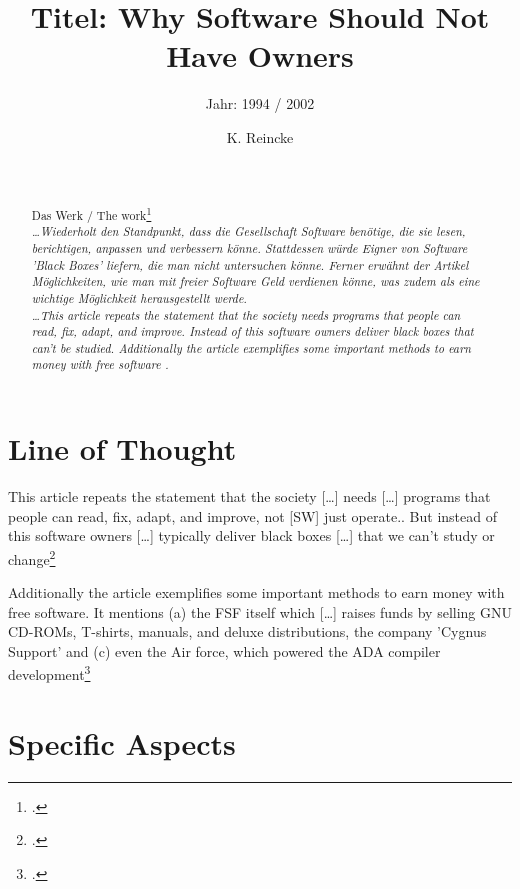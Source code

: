 \documentclass[DIV=calc,BCOR=5mm,11pt,headings=small,oneside,abstract=true, toc=bib]{scrartcl}
\begin{document}

\titlehead{Literaturexzerpt}
\subject{Autor(en): Stallman / Stallman1994a}
\title{Titel: Why Software Should Not Have Owners}
\subtitle{Jahr: 1994 / 2002 }
\author{K. Reincke}

\maketitle

\begin{abstract}
\noindent
\cite[(in:)][]{StaGay2002a} \\
\noindent
\cite[(ist:)][]{Stallman1994a} \\
Das Werk / The work\footcite[][]{Stallman1994a} \\
\noindent \itshape
\ldots  Wiederholt den Standpunkt, dass die Gesellschaft Software benötige, die
sie lesen, berichtigen, anpassen und verbessern könne. Stattdessen würde Eigner
von Software 'Black Boxes' liefern, die man nicht untersuchen könne. Ferner
erwähnt der Artikel Möglichkeiten, wie man mit freier Software Geld verdienen
könne, was zudem als eine wichtige Möglichkeit herausgestellt werde.
\\
\noindent
\ldots This article repeats the statement that the society needs programs that
people can read, fix, adapt, and improve. Instead of this software owners
deliver black boxes that can't be studied. Additionally the article exemplifies
some important methods to earn money with free software .
\end{abstract}
\footnotesize
\normalsize

\section{Line of Thought}

This article repeats the statement that the \glqq{}society [\ldots] needs
[\ldots] programs that people can read, fix, adapt, and improve, not [SW] just
operate.\grqq{}. But instead of this software owners \glqq{}[\ldots]
typically deliver black boxes [\ldots] that we can't study or
change\grqq{}\footcite[cf.][47f]{Stallman1994a}

 Additionally the article exemplifies some important methods to earn money with
 free software. It mentions (a) the FSF itself which \glqq{}[\ldots] raises
 funds by selling GNU CD-ROMs, T-shirts, manuals, and deluxe
 distributions\grqq{}, the company 'Cygnus Support' and (c) even the Air force,
 which powered the ADA compiler development\footcite[cf.][48]{Stallman1994a}
 
 

\section{Specific Aspects}

\small

\end{document}
